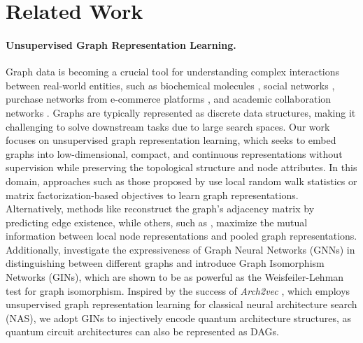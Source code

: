 \documentclass{article} %
\begin{document}
\section{Related Work}
\paragraph{Unsupervised Graph Representation Learning.} Graph data is becoming a crucial tool for understanding complex interactions between real-world entities, such as biochemical molecules \citep{jiang2021learning}, social networks \citep{shen2023uniskgrep}, purchase networks from e-commerce platforms \citep{li2021towards}, and academic collaboration networks \citep{newman2001structure}. Graphs are typically represented as discrete data structures, making it challenging to solve downstream tasks due to large search spaces.
Our work focuses on unsupervised graph representation learning, which seeks to embed graphs into low-dimensional, compact, and continuous representations without supervision while preserving the topological structure and node attributes. In this domain, approaches such as those proposed by \citet{perozzi2014deepwalk, wang2016structural, grover2016node2vec, tang2015line} use local random walk statistics or matrix factorization-based objectives to learn graph representations. Alternatively, methods like \citet{kipf2016variational, hamilton2017inductive} reconstruct the graph's adjacency matrix by predicting edge existence, while others, such as \citet{velivckovic2018deep, sun2019infograph, peng2020graph}, maximize the mutual information between local node representations and pooled graph representations.
Additionally, \citet{xu2019powerful} investigate the expressiveness of Graph Neural Networks (GNNs) in distinguishing between different graphs and introduce Graph Isomorphism Networks (GINs), which are shown to be as powerful as the Weisfeiler-Lehman test \citep{leman1968reduction} for graph isomorphism. Inspired by the success of \textit{Arch2vec} \citep{yan2020does}, which employs unsupervised graph representation learning for classical neural architecture search (NAS), we adopt GINs to injectively encode quantum architecture structures, as quantum circuit architectures can also be represented as DAGs.
\end{document}
